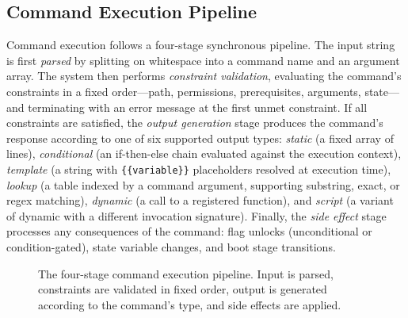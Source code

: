 \subsection{Command Execution Pipeline}\label{subsec:cmd-pipeline}

Command execution follows a four-stage synchronous pipeline. The input string is first \emph{parsed} by splitting on whitespace into a command name and an argument array. The system then performs \emph{constraint validation}, evaluating the command's constraints in a fixed order---path, permissions, prerequisites, arguments, state---and terminating with an error message at the first unmet constraint. If all constraints are satisfied, the \emph{output generation} stage produces the command's response according to one of six supported output types: \emph{static} (a fixed array of lines), \emph{conditional} (an if-then-else chain evaluated against the execution context), \emph{template} (a string with \texttt{\{\{variable\}\}} placeholders resolved at execution time), \emph{lookup} (a table indexed by a command argument, supporting substring, exact, or regex matching), \emph{dynamic} (a call to a registered function), and \emph{script} (a variant of dynamic with a different invocation signature). Finally, the \emph{side effect} stage processes any consequences of the command: flag unlocks (unconditional or condition-gated), state variable changes, and boot stage transitions.

\begin{figure}[ht]
    \centering
    \caption{The four-stage command execution pipeline. Input is parsed, constraints are validated in fixed order, output is generated according to the command's type, and side effects are applied.}
    \label{fig:cmd-pipeline}
\end{figure}


